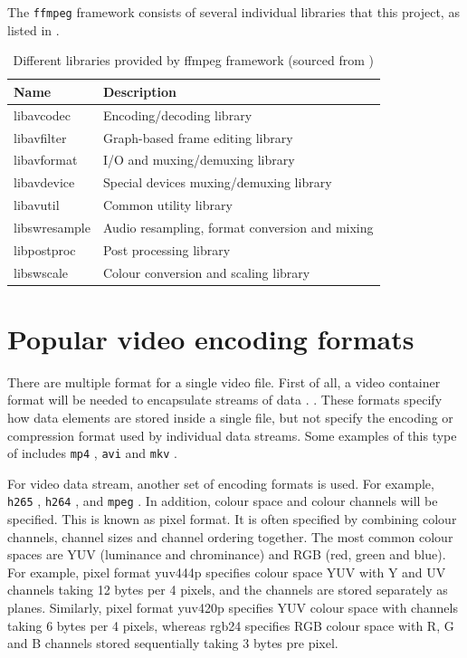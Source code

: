 The \texttt{ffmpeg} framework consists of several individual libraries that  this project, as listed in .

\begin{table}[t]
  \centering
  \begin{tabular}{l|l}
    \hline
    \textbf{Name} & \textbf{Description} \\ \hline
    \hline
    libavcodec & Encoding/decoding library  \\ \hline
    libavfilter & Graph-based frame editing library \\ \hline
    libavformat & I/O and muxing/demuxing library   \\ \hline
    libavdevice & Special devices muxing/demuxing library \\ \hline
    libavutil & Common utility library    \\ \hline
    libswresample & Audio resampling, format conversion and mixing  \\ \hline
    libpostproc & Post processing library \\ \hline
    libswscale & Colour conversion and scaling library  \\ \hline
  \end{tabular}
  \caption{\footnotesize Different libraries provided by ffmpeg framework (sourced from \cite{ffmpeg})}
  \label{tbl:ffmpeg}
\end{table}

\section{Popular video encoding formats}

There are multiple format  for a single video file. First of all, a video container format will be needed to encapsulate  streams of  data . . These formats specify how data elements are stored inside a single file, but  not specify the encoding or compression format used by individual data streams. Some examples of this type of  includes \texttt{mp4} \cite{mp4}, \texttt{avi} \cite{avi} and \texttt{mkv} \cite{mkv}.

For  video data stream, another set of encoding formats is used. For example, \texttt{h265} \cite{h265}, \texttt{h264} \cite{h264}, and \texttt{mpeg} \cite{mpeg}. In addition,  colour space and colour channels will  be specified. This is known as pixel format. It is often specified by combining colour channels, channel sizes and channel ordering together. The  most common colour spaces are YUV (luminance and chrominance) and RGB (red, green and blue). For example, pixel format yuv444p specifies colour space YUV with Y and UV channels taking 12 bytes per 4 pixels, and the channels are stored separately as planes. Similarly, pixel format yuv420p specifies YUV colour space with channels taking 6 bytes per 4 pixels, whereas rgb24 specifies RGB colour space with R, G and B channels stored sequentially taking 3 bytes pre pixel.

